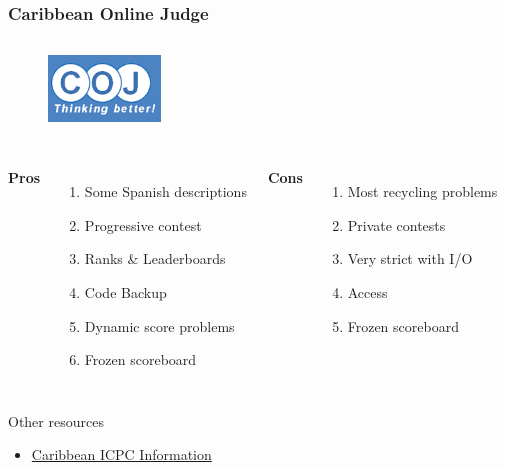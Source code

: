 \documentclass{beamer}
\begin{document}

	



\begin{frame}
	\frametitle{Caribbean Online Judge}
	\begin{figure}[t]
		\href{http://coj.uci.cu/general/faqs.xhtml?lang=es}{\includegraphics[width=3cm,height=2.5cm,keepaspectratio]{images/judges/coj}}
	\end{figure}
	
	\begin{columns}[c] %
		\textbf{Pros}
		\begin{enumerate}
			\item Some Spanish descriptions  
			\item Progressive contest
			\item Ranks \& Leaderboards
			\item Code Backup
			\item Dynamic score problems
			\item Frozen scoreboard
		\end{enumerate}
		\textbf{Cons}
		\begin{enumerate}
			\item Most recycling problems
			\item Private contests
			\item Very strict with I/O
			\item Access
			\item Frozen scoreboard
		\end{enumerate}
	\end{columns}
	\begin{block}{Other resources}
		\begin{itemize}
			\item \href{https://coj-forum.uci.cu/viewtopic.php?f=35&t=2846}{Caribbean ICPC Information} 
		\end{itemize}
	\end{block}

\end{frame}
\end{document}
